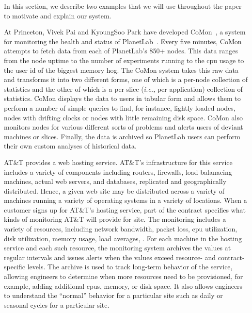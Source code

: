 In this section, we describe two examples that we will use throughout
the paper to motivate and explain our system.

At Princeton, Vivek Pai and KyoungSoo Park have developed
CoMon~\cite{comon}, a system for monitoring the health and status of
PlanetLab~\cite{planetlab}.  Every five minutes, CoMon attempts to
fetch data from each of PlanetLab's 850+ nodes.  This data ranges from
the node uptime to the number of experiments running to the cpu usage
to the user id of the biggest memory hog.  The CoMon system takes this
raw data and transforms it into two different forms, one of which is a
per-node collection of statistics and the other of which is a
per-slice ({\em i.e.,} per-application) collection of statistics.
CoMon displays the data to users in tabular form and allows them to
perform a number of simple queries to find, for instance, lightly
loaded nodes, nodes with drifting clocks or nodes with little
remaining disk space.  CoMon also monitors nodes for various different
sorts of problems and alerts users of deviant machines or slices.
Finally, the data is archived so PlanetLab users can perform their own
custom analyses of historical data.

AT\&T provides a web hosting service.  AT\&T's infrastructure for this
service includes a variety of components including routers, firewalls,
load balanacing machines, actual web servers, and databases,
replicated and geographically distributed.  Hence, a given web site
may be distributed across a variety of machines running a variety of
operating systems in a variety of locations.  When a customer signs up
for AT\&T's hosting service, part of the contract specifies what kinds
of monitoring AT\&T will provide for site.  The monitoring includes a
variety of resources, including network bandwidth, packet loss, cpu
utilization, disk utilization, memory usage, load averages, \etc{}. For
each machine in the hosting service and each such resource, the
monitoring system archives the values at regular intervals and issues
alerts when the values exceed resource- and contract-specific levels.
The archive is used to track long-term behavior of the service,
allowing engineers to determine when more resources need to be
provisioned, for example, adding additional cpus, memory, or disk
space.  It also allows engineers to understand the ``normal'' behavior
for a particular site such as daily or seasonal cycles for a
particular site. 


